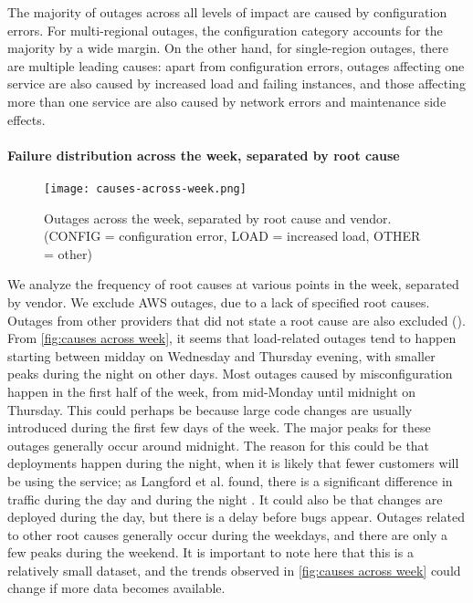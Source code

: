The majority of outages across all levels of impact are caused by configuration errors.
For multi-regional outages, the configuration category accounts for the majority by a wide margin.
On the other hand, for single-region outages, there are multiple leading causes: apart from configuration errors, outages affecting one service are also caused by increased load and failing instances, and those affecting more than one service are also caused by network errors and maintenance side effects.

\paragraph{Failure distribution across the week, separated by root cause}
\begin{figure}
  \centering
  \texttt{[image: causes-across-week.png]}
  \caption{Outages across the week, separated by root cause and vendor. (CONFIG = configuration error, LOAD = increased load, OTHER = other)}
  \label{fig:causes across week}
\end{figure}

We analyze the frequency of root causes at various points in the week, separated by vendor.
We exclude AWS outages, due to a lack of specified root causes.
Outages from other providers that did not state a root cause are also excluded ().
From \autoref{fig:causes across week}, it seems that load-related outages tend to happen starting between midday on Wednesday and Thursday evening, with smaller peaks during the night on other days.
Most outages caused by misconfiguration happen in the first half of the week, from mid-Monday until midnight on Thursday.
This could perhaps be because large code changes are usually introduced during the first few days of the week.
The major peaks for these outages generally occur around midnight.
The reason for this could be that deployments happen during the night, when it is likely that fewer customers will be using the service; as Langford et al. found, there is a significant difference in traffic during the day and during the night \cite{langford2012}.
It could also be that changes are deployed during the day, but there is a delay before bugs appear.
Outages related to other root causes generally occur during the weekdays, and there are only a few peaks during the weekend.
It is important to note here that this is a relatively small dataset, and the trends observed in \autoref{fig:causes across week} could change if more data becomes available.

